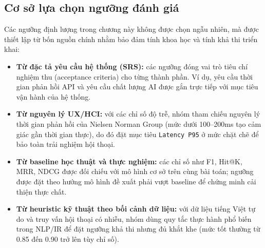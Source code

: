 \subsection{Cơ sở lựa chọn ngưỡng đánh giá}

Các ngưỡng định lượng trong chương này không được chọn ngẫu nhiên, mà được thiết lập từ bốn nguồn chính nhằm bảo đảm tính khoa học và tính khả thi triển khai:

\begin{itemize}
    \item \textbf{Từ đặc tả yêu cầu hệ thống (SRS):} các ngưỡng đóng vai trò tiêu chí nghiệm thu (acceptance criteria) cho từng thành phần. Ví dụ, yêu cầu thời gian phản hồi API và yêu cầu chất lượng AI được gắn trực tiếp với mục tiêu vận hành của hệ thống.
    \item \textbf{Từ nguyên lý UX/HCI:} với các chỉ số độ trễ, nhóm tham chiếu nguyên lý thời gian phản hồi của Nielsen Norman Group (mức dưới 100--200ms tạo cảm giác gần thời gian thực), do đó đặt mục tiêu \texttt{Latency P95} ở mức chặt chẽ để bảo toàn trải nghiệm hội thoại.
    \item \textbf{Từ baseline học thuật và thực nghiệm:} các chỉ số như F1, Hit@K, MRR, NDCG được đối chiếu với mô hình cơ sở trên cùng bài toán; ngưỡng được đặt theo hướng mô hình đề xuất phải vượt baseline để chứng minh cải thiện thực chất.
    \item \textbf{Từ heuristic kỹ thuật theo bối cảnh dữ liệu:} với dữ liệu tiếng Việt tự do và truy vấn hội thoại có nhiễu, nhóm dùng quy tắc thực hành phổ biến trong NLP/IR để đặt ngưỡng khả thi nhưng đủ khắt khe (mức tốt thường từ 0.85 đến 0.90 trở lên tùy chỉ số).
\end{itemize}

